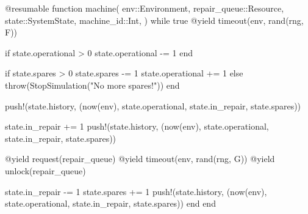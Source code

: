 \documentclass[
  12pt,
  a4paper,
  DIV=11,
  numbers=noendperiod]{scrreprt}
\newenvironment{Shaded}{\begin{snugshade}}{\end{snugshade}}
\newcommand{\ConstantTok}[1]{\textcolor[rgb]{0.56,0.35,0.01}{#1}}
\newcommand{\ControlFlowTok}[1]{\textcolor[rgb]{0.00,0.23,0.31}{#1}}
\newcommand{\DataTypeTok}[1]{\textcolor[rgb]{0.68,0.00,0.00}{#1}}
\newcommand{\FloatTok}[1]{\textcolor[rgb]{0.68,0.00,0.00}{#1}}
\newcommand{\FunctionTok}[1]{\textcolor[rgb]{0.28,0.35,0.67}{#1}}
\newcommand{\KeywordTok}[1]{\textcolor[rgb]{0.00,0.23,0.31}{#1}}
\newcommand{\NormalTok}[1]{\textcolor[rgb]{0.00,0.23,0.31}{#1}}
\newcommand{\OperatorTok}[1]{\textcolor[rgb]{0.37,0.37,0.37}{#1}}
\newcommand{\PreprocessorTok}[1]{\textcolor[rgb]{0.68,0.00,0.00}{#1}}
\newcommand{\StringTok}[1]{\textcolor[rgb]{0.13,0.47,0.30}{#1}}
\begin{document}
\begin{Shaded}
\begin{Highlighting}[]
\PreprocessorTok{@resumable} \KeywordTok{function} \FunctionTok{machine}\NormalTok{(}
\NormalTok{    env}\OperatorTok{::}\DataTypeTok{Environment}\NormalTok{,}
\NormalTok{    repair\_queue}\OperatorTok{::}\DataTypeTok{Resource}\NormalTok{,}
\NormalTok{    state}\OperatorTok{::}\DataTypeTok{SystemState}\NormalTok{,}
\NormalTok{    machine\_id}\OperatorTok{::}\DataTypeTok{Int}\NormalTok{,}
\NormalTok{)}
    \ControlFlowTok{while} \ConstantTok{true}
        \PreprocessorTok{@yield} \FunctionTok{timeout}\NormalTok{(env, }\FunctionTok{rand}\NormalTok{(rng, F))}

        \ControlFlowTok{if}\NormalTok{ state.operational }\OperatorTok{\textgreater{}} \FloatTok{0}
\NormalTok{            state.operational }\OperatorTok{{-}=} \FloatTok{1}
        \ControlFlowTok{end}

        \ControlFlowTok{if}\NormalTok{ state.spares }\OperatorTok{\textgreater{}} \FloatTok{0}
\NormalTok{            state.spares }\OperatorTok{{-}=} \FloatTok{1}
\NormalTok{            state.operational }\OperatorTok{+=} \FloatTok{1}
        \ControlFlowTok{else}
            \FunctionTok{throw}\NormalTok{(}\FunctionTok{StopSimulation}\NormalTok{(}\StringTok{"No more spares!"}\NormalTok{))}
        \ControlFlowTok{end}

        \FunctionTok{push!}\NormalTok{(state.history, (}\FunctionTok{now}\NormalTok{(env), state.operational, state.in\_repair, state.spares))}

\NormalTok{        state.in\_repair }\OperatorTok{+=} \FloatTok{1}
        \FunctionTok{push!}\NormalTok{(state.history, (}\FunctionTok{now}\NormalTok{(env), state.operational, state.in\_repair, state.spares))}

        \PreprocessorTok{@yield} \FunctionTok{request}\NormalTok{(repair\_queue)}
        \PreprocessorTok{@yield} \FunctionTok{timeout}\NormalTok{(env, }\FunctionTok{rand}\NormalTok{(rng, G))}
        \PreprocessorTok{@yield} \FunctionTok{unlock}\NormalTok{(repair\_queue)}

\NormalTok{        state.in\_repair }\OperatorTok{{-}=} \FloatTok{1}
\NormalTok{        state.spares }\OperatorTok{+=} \FloatTok{1}
        \FunctionTok{push!}\NormalTok{(state.history, (}\FunctionTok{now}\NormalTok{(env), state.operational, state.in\_repair, state.spares))}
    \ControlFlowTok{end}
\KeywordTok{end}
\end{Highlighting}
\end{Shaded}
\end{document}
